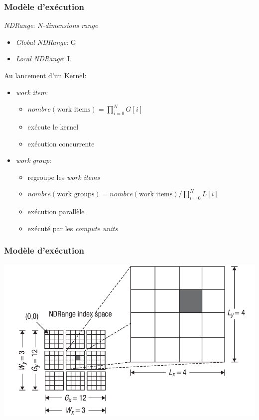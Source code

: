 \begin{frame}
    \frametitle{Modèle d'exécution}

    \textit{NDRange}: \textit{N-dimensions range}\pause{}
    \begin{itemize}
        \item \textit{Global NDRange}: G
        \item \textit{Local NDRange}: L
    \end{itemize}\pause{}
    
    Au lancement d'un Kernel:
    \begin{itemize}
        \item \textit{work item}:\pause{} 
            \begin{itemize}
                \item ${\displaystyle nombre(\textrm{work items}) = \prod_{i=0}^{N}G[i]}$\pause{}
                \item exécute le kernel
                \item exécution concurrente
            \end{itemize}

        \item \textit{work group}:\pause{}
            \begin{itemize}
                \item regroupe les \textit{work items}\pause{}
                \item ${\displaystyle nombre(\textrm{work groups}) = nombre(\textrm{work items}) /
                    \prod_{i=0}^{N}L[i]}$\pause{}
                \item exécution parallèle
                \item exécuté par les \textit{compute units}
            \end{itemize}
    \end{itemize}
\end{frame}

\begin{frame}
    \frametitle{Modèle d'exécution}
    \includegraphics[width=\textwidth]{../resources/execution_model.png}
\end{frame}

